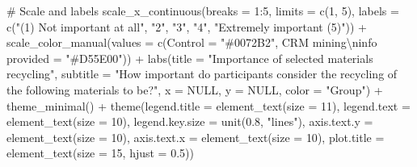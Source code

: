 \documentclass[
  letterpaper,
  DIV=11,
  numbers=noendperiod]{scrartcl}
\newenvironment{Shaded}{\begin{snugshade}}{\end{snugshade}}
\newcommand{\AttributeTok}[1]{\textcolor[rgb]{0.40,0.45,0.13}{#1}}
\newcommand{\CommentTok}[1]{\textcolor[rgb]{0.37,0.37,0.37}{#1}}
\newcommand{\ConstantTok}[1]{\textcolor[rgb]{0.56,0.35,0.01}{#1}}
\newcommand{\DecValTok}[1]{\textcolor[rgb]{0.68,0.00,0.00}{#1}}
\newcommand{\FloatTok}[1]{\textcolor[rgb]{0.68,0.00,0.00}{#1}}
\newcommand{\FunctionTok}[1]{\textcolor[rgb]{0.28,0.35,0.67}{#1}}
\newcommand{\NormalTok}[1]{\textcolor[rgb]{0.00,0.23,0.31}{#1}}
\newcommand{\OtherTok}[1]{\textcolor[rgb]{0.00,0.23,0.31}{#1}}
\newcommand{\SpecialCharTok}[1]{\textcolor[rgb]{0.37,0.37,0.37}{#1}}
\newcommand{\StringTok}[1]{\textcolor[rgb]{0.13,0.47,0.30}{#1}}
\begin{document}
\begin{Shaded}
\begin{Highlighting}[]
  \CommentTok{\# Scale and labels}
  \FunctionTok{scale\_x\_continuous}\NormalTok{(}\AttributeTok{breaks =} \DecValTok{1}\SpecialCharTok{:}\DecValTok{5}\NormalTok{, }\AttributeTok{limits =} \FunctionTok{c}\NormalTok{(}\DecValTok{1}\NormalTok{, }\DecValTok{5}\NormalTok{),}
                     \AttributeTok{labels =} \FunctionTok{c}\NormalTok{(}\StringTok{"(1) Not important at all"}\NormalTok{, }\StringTok{"2"}\NormalTok{, }\StringTok{"3"}\NormalTok{, }\StringTok{"4"}\NormalTok{, }\StringTok{"Extremely important (5)"}\NormalTok{)) }\SpecialCharTok{+}
  \FunctionTok{scale\_color\_manual}\NormalTok{(}\AttributeTok{values =} \FunctionTok{c}\NormalTok{(}\AttributeTok{Control =} \StringTok{"\#0072B2"}\NormalTok{, }\StringTok{\textasciigrave{}}\AttributeTok{CRM mining}\SpecialCharTok{\textbackslash{}n}\AttributeTok{info provided}\StringTok{\textasciigrave{}} \OtherTok{=} \StringTok{"\#D55E00"}\NormalTok{)) }\SpecialCharTok{+}
  \FunctionTok{labs}\NormalTok{(}\AttributeTok{title =} \StringTok{"Importance of selected materials recycling"}\NormalTok{,}
       \AttributeTok{subtitle =} \StringTok{"How important do participants consider the recycling of the following materials to be?"}\NormalTok{,}
       \AttributeTok{x =} \ConstantTok{NULL}\NormalTok{, }\AttributeTok{y =} \ConstantTok{NULL}\NormalTok{, }\AttributeTok{color =} \StringTok{"Group"}\NormalTok{) }\SpecialCharTok{+}
  \FunctionTok{theme\_minimal}\NormalTok{() }\SpecialCharTok{+}
  \FunctionTok{theme}\NormalTok{(}\AttributeTok{legend.title =} \FunctionTok{element\_text}\NormalTok{(}\AttributeTok{size =} \DecValTok{11}\NormalTok{), }\AttributeTok{legend.text =} \FunctionTok{element\_text}\NormalTok{(}\AttributeTok{size =} \DecValTok{10}\NormalTok{),}
        \AttributeTok{legend.key.size =} \FunctionTok{unit}\NormalTok{(}\FloatTok{0.8}\NormalTok{, }\StringTok{"lines"}\NormalTok{), }\AttributeTok{axis.text.y =} \FunctionTok{element\_text}\NormalTok{(}\AttributeTok{size =} \DecValTok{10}\NormalTok{),}
        \AttributeTok{axis.text.x =} \FunctionTok{element\_text}\NormalTok{(}\AttributeTok{size =} \DecValTok{10}\NormalTok{), }\AttributeTok{plot.title =} \FunctionTok{element\_text}\NormalTok{(}\AttributeTok{size =} \DecValTok{15}\NormalTok{, }\AttributeTok{hjust =} \FloatTok{0.5}\NormalTok{))}
\end{Highlighting}
\end{Shaded}
\end{document}
